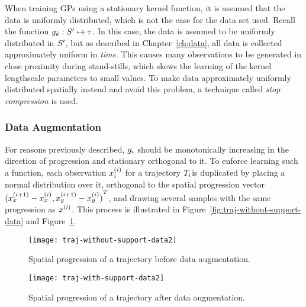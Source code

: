 When training GPs using a stationary kernel function, it is assumed
that the data is uniformly distributed, which is not the case for the
data set used. Recall the function $g_{k} : S' \mapsto
\tau$. In this case, the data is assumed to be uniformly
distributed in $S'$, but as described in Chapter~\ref{ch:data},
all data is collected approximately uniform in \textit{time}. This causes many
observations to be generated in close proximity during stand-stills, which skews the
learning of the kernel lengthscale parameters to small values. To
make data approximately uniformly distributed spatially instead and 
avoid this problem, a technique called \textit{stop compression} is used.

\subsubsection{Data Augmentation}
\label{sec:data-augmentation}
For reasons previously described, $g_{i}$ should be monotonically increasing in
the direction of progression and stationary orthogonal to it.
To enforce learning such a function, each
observation $x_{i}^{(i)}$ for a trajectory $T_{i}$is duplicated by placing a normal distribution
over it, orthogonal to the spatial progression vector ${(x^{(i+1)}_x -
  x^{(i)}_x, x^{(i+1)}_y - x^{(i)}_y)}^T$, and drawing several samples
with the same progression as $x^{(i)}$. This process is illustrated in
Figure~\ref{fig:traj-without-support-data} and
Figure~\ref{fig:traj-with-support-data}.
\begin{figure}
  \begin{minipage}{.46\textwidth}
    \texttt{[image: traj-without-support-data2]}
    \caption{Spatial progression of a trajectory
      before data augmentation.}\label{fig:traj-without-support-data}
  \end{minipage}
  \hspace{5pt}
  \begin{minipage}{.46\textwidth}
    \texttt{[image: traj-with-support-data2]}
    \caption{Spatial progression of a trajectory
      after data augmentation. }\label{fig:traj-with-support-data}
  \end{minipage}
\end{figure}

